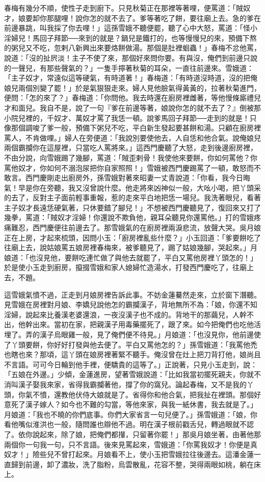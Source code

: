春梅有幾分不順，使性子走到廚下。只見秋菊正在那裡等著哩，便罵道：「賊奴才，娘要卸你那腿哩！說你怎的就不去了。爹等著吃了餅，要往廟上去。急的爹在前邊暴跳，叫我採了你去哩！」這孫雪娥不聽便罷，聽了心中大怒，罵道：「怪小淫婦兒！馬回子拜節──來到的就是？鍋兒是鐵打的，也等慢慢兒的來，預備下熬的粥兒又不吃，忽剌八新興出來要烙餅做湯。那個是肚裡蛔蟲！」春梅不忿他罵，說道：「沒的扯屄淡！主子不使了來，那個好來問你要。有與沒，俺們到前邊只說的一聲兒，有那些聲氣的？」一隻手擰著秋菊的耳朵，一直往前邊來。雪娥道：「主子奴才，常遠似這等硬氣，有時道著！」春梅道：「有時道沒時道，沒的把俺娘兒兩個別變了罷！」於是氣狠狠走來。婦人見他臉氣得黃黃的，拉著秋菊進門，便問：「怎的來了？」春梅道：「你問他。我去時還在廚房裡雌著，等他慢條廝禮兒才和面兒。我自不是，說了一句『爹在前邊等著，娘說你怎的就不去了？』倒被那小院兒裡的，千奴才、萬奴才罵了我恁一頓。說爹馬回子拜節──走到的就是！只像那個調唆了爹一般，預備下粥兒不吃，平白新生發起要甚餅和湯。只顧在廚房裡罵人，不肯做哩。」婦人在旁便道：「我說別要使他去，人自恁和他合氣。說俺娘兒兩個霸攔你在這屋裡，只當吃人罵將來。」這西門慶聽了大怒，走到後邊廚房裡，不由分說，向雪娥踢了幾腳，罵道：「賊歪剌骨！我使他來要餅，你如何罵他？你罵他奴才，你如何不溺泡尿把你自家照照！」雪娥被西門慶踢罵了一頓，敢怒而不敢言。西門慶剛走出廚房外，孫雪娥對著來昭妻一丈青說道：「你看，我今日晦氣！早是你在旁聽，我又沒曾說什麼。他走將來凶神似一般，大吆小喝，把丫頭采的去了，反對主子面前輕事重報，惹的走來平白地把恁一場兒。我洗著眼兒，看著主子奴才長遠恁硬氣著，只休要錯了腳兒！」不想被西門慶聽見了，復回來又打了幾拳，罵道：「賊奴才淫婦！你還說不欺負他，親耳朵聽見你還罵他。」打的雪娥疼痛難忍，西門慶便往前邊去了。那雪娥氣的在廚房裡兩淚悲流，放聲大哭。吳月娘正在上房，才起來梳頭，因問小玉：「廚房裡亂些什麼？」小玉回道：「爹要餅吃了往廟上去，說姑娘罵五娘房裡春梅來，被爹聽見了，踢了姑娘幾腳，哭起來。」月娘道：「也沒見他，要餅吃連忙做了與他去就罷了，平白又罵他房裡丫頭怎的！」於是使小玉走到廚房，攛掇雪娥和家人媳婦忙造湯水，打發西門慶吃了，往廟上去，不題。

這雪娥氣憤不過，正走到月娘房裡告訴此事。不妨金蓮驀然走來，立於窗下潛聽。見雪娥在房裡對月娘、李嬌兒說他怎的霸攔漢子，背地無所不為：「娘，你還不知淫婦，說起來比養漢老婆還浪，一夜沒漢子也不成的。背地干的那繭兒，人幹不出，他幹出來。當初在家，把親漢子用毒藥擺死了，跟了來。如今把俺們也吃他活埋了。弄的漢子烏眼雞一般，見了俺們便不待見。」月娘道：「也沒見你，他前邊使了丫頭要餅，你好好打發與他去便了。平白又罵他怎的？」孫雪娥道：「我罵他禿也瞎也來？那頃，這丫頭在娘房裡著緊不聽手。俺沒曾在灶上把刀背打他，娘尚且不言語。可可今日輪到他手裡，便驕貴的這等了。」正說著，只見小玉走到，說： 「五娘在外邊。」少傾，金蓮進房，望著雪娥說道：「比如我當初擺死親夫，你就不消叫漢子娶我來家，省得我霸攔著他，撐了你的窩兒。論起春梅，又不是我的丫頭，你氣不憤，還教他伏侍大娘就是了。省得你和他合氣，把我扯在裡頭。那個好意死了漢子嫁人？如今也不難的勾當，等他來家，與我一紙休書，我去就是了。」 月娘道：「我也不曉的你們底事。你們大家省言一句兒便了。」孫雪娥道：「娘，你看他嘴似淮洪也一般，隨問誰也辯他不過。明在漢子根前戳舌兒，轉過眼就不認了。依你說起來，除了娘，把俺們都攆，只留著你罷！」那吳月娘坐著，由著他那兩個你一句我一句，只不言語。後來見罵起來，雪娥道：「你罵我奴才！你便是真奴才！」險些兒不曾打起來。月娘看不上，使小玉把雪娥拉往後邊去。這潘金蓮一直歸到前邊，卸了濃妝，洗了脂粉，烏雲散亂，花容不整，哭得兩眼如桃，躺在床上。

